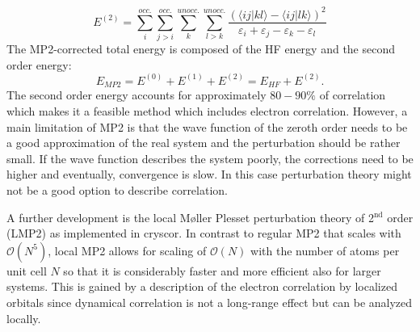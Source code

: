 \documentclass[11pt,DIV=13,BCOR=5mm,a4paper,headinclude]{scrbook}
\begin{document}
\begin{equation}
 E^{(2)}=\sum\limits_{i}^{occ.}\sum\limits_{j>i}^{occ.}\sum\limits_{k}^{unocc.}\sum\limits_{l>k}^{unocc.} \frac{(\langle ij|kl\rangle - \langle ij|lk\rangle)^2}{\varepsilon_i + \varepsilon_j - \varepsilon_k - \varepsilon_l}
\end{equation}
The MP2-corrected total energy is composed of the HF energy and the second order energy:
\begin{equation}
 E_{MP2} = E^{(0)}+E^{(1)} + E^{(2)} = E_{HF} + E^{(2)}.
\end{equation}
The second order energy accounts for approximately $80-90\%$ of correlation which makes it a feasible method which includes electron correlation.
However, a main limitation of MP2 is that the wave function of the zeroth order needs to be a good approximation of the real system and the perturbation should be rather small.
If the wave function describes the system poorly, the corrections need to be higher and eventually, convergence is slow.
In this case perturbation theory might not be a good option to describe correlation.


A further development is the local M\o{}ller Plesset perturbation theory\cite{usvyat2015,usvyatbook,Maschio2007} of 2$^{\textrm{nd}}$ order (LMP2) as implemented in cryscor\cite{cryscor}.
In contrast to regular MP2 that scales with $\mathcal{O}(N^5)$, local MP2 allows for scaling of $\mathcal{O}(N)$ with the number of atoms per unit cell $N$ so that it is considerably faster and more efficient also for larger systems.
This is gained by a description of the electron correlation by localized orbitals since dynamical correlation is not a long-range effect but can be analyzed locally.
\end{document}

